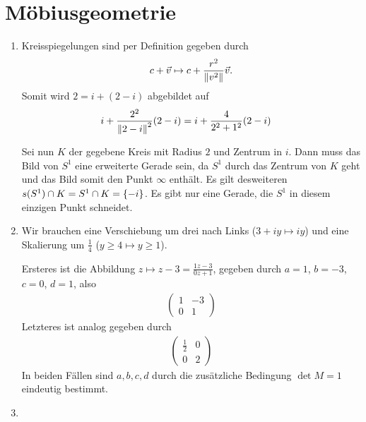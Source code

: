 \documentclass{article}
\begin{document}
	\pagebreak
	
	\section*{Möbiusgeometrie}
	\begin{enumerate}
		\item[6.1 - \tbf{5}] 
		
		Kreisspiegelungen sind per Definition gegeben durch
		\begin{align*}
			c + \vec v \mapsto c + \frac{r^2}{\norm{v^2}}\vec v.
		\end{align*}
		Somit wird $2 = i + (2 - i)$ abgebildet auf
		\begin{align*}
			i + \frac{2^2}{\norm{2-i}^2}(2-i)
			&=
			i +
			\frac{4}{2^2 + 1^2}(2-i)
		\end{align*}
	
		Sei nun $K$ der gegebene Kreis mit Radius $2$ und Zentrum in $i$. Dann muss das Bild von $S^1$ eine erweiterte Gerade sein, da $S^1$ durch das Zentrum von $K$ geht und das Bild somit den Punkt $\infty$ enthält. Es gilt desweiteren $s(S^1) \cap K = S^1 \cap K = \qty{-i}$. Es gibt nur eine Gerade, die $S^1$ in diesem einzigen Punkt schneidet.
		\item[10.2 - \tbf{4}]
		
		
		Wir brauchen eine Verschiebung um drei nach Links ($3 + iy \mapsto iy$) und eine Skalierung um $\frac{1}{4}$ ($y \geq 4 \mapsto y \geq 1$).
		
		Ersteres ist die Abbildung $z \mapsto z - 3 = \frac{1z -3}{0z + 1}$, gegeben durch $a = 1$, $b = -3$, $c = 0$, $d = 1$, also 
		\begin{align*}
			\begin{pmatrix}
				1 & -3\\
				0 & 1
			\end{pmatrix}
		\end{align*}
		Letzteres ist analog gegeben durch
		\begin{align*}
			\begin{pmatrix}
				\frac{1}{2} & 0\\
				0 & 2
			\end{pmatrix}
		\end{align*}
		In beiden Fällen sind $a,b,c,d$ durch die zusätzliche Bedingung $\det M = 1$ eindeutig bestimmt.
		\item[10.3 - \tbf{4}]
		

\end{enumerate}
\end{document}
